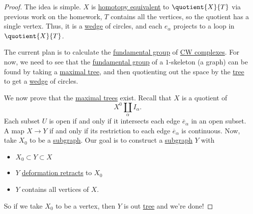 \begin{proof}
	The idea is simple. \(X\) is \hyperref[def:homotopy-equivalence]{homotopy equivalent} to \(\quotient{X}{T}\) via previous work on the homework,
	\(T\) contains all the vertices, so the quotient has a single vertex. Thus, it is a \hyperref[sssec:Wedge-sum]{wedge} of circles, and each
	\(e_\alpha \) projects to a loop in \(\quotient{X}{T} \).
	\begin{figure}[H]
		\centering
		\label{fig:pf:lec12-1}
	\end{figure}

	\par The current plan is to calculate the  \hyperref[def:fundamental-group]{fundamental group} of \hyperref[def:CW-Complex]{CW complexes}.
	For now, we need to see that the \hyperref[def:fundamental-group]{fundamental group} of a \(1\)-skeleton (a graph) can be found by taking
	a \hyperref[def:maximal-tree]{maximal tree}, and then quotienting out the space by the \hyperref[def:tree]{tree} to get a \hyperref[sssec:Wedge-sum]{wedge} of circles.
	\begin{figure}[H]
		\centering
		\label{fig:pf:lec12-2}
	\end{figure}

	\par We now prove that the \hyperref[def:maximal-tree]{maximal trees} exist. Recall that \(X\) is a quotient of
	\[
		X^0\coprod_\alpha I_\alpha.
	\]
	Each subset \(U\) is open if and only if it intersects each edge \(\overline{e} _\alpha \) in an open subset. A map \(X\to Y\) if and only if
	its restriction to each edge \(\overline{e} _\alpha \) is continuous. Now, take \(X_0\) to be a \hyperref[def:subgraph]{subgraph}.
	Our goal is to construct a \hyperref[def:subgraph]{subgraph} \(Y\) with
	\begin{itemize}
		\item \(X_0 \subset Y\subset X\)
		\item \(Y\) \hyperref[def:deformation-retraction]{deformation retracts} to \(X_0\)
		\item \(Y\) contains all vertices of \(X\).
	\end{itemize}

	So if we take \(X_0\) to be a vertex, then \(Y\) is out \hyperref[def:tree]{tree} and we're done!


\end{proof}

